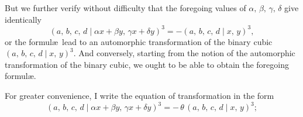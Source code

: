 \documentclass[11pt]{article}
\begin{document}
\medskip
But we further verify without difficulty that the foregoing values of $\alpha,\,\beta,\,\gamma,\,\delta$ give
identically
\[
  (a,\,b,\,c,\,d \mid \alpha x + \beta y,\,\gamma x + \delta y)^{3} = -(a,\,b,\,c,\,d \mid x,\,y)^{3},
\]
or the formul\ae\ lead to an automorphic transformation of the binary cubic
$(a,\,b,\,c,\,d \mid x,\,y)^{3}$.
And conversely, starting from the notion of the automorphic transformation of the binary
cubic, we ought to be able to obtain the foregoing formul\ae.

\medskip
For greater convenience, I write the equation of transformation in the form
\[
  (a,\,b,\,c,\,d \mid \alpha x + \beta y,\,\gamma x + \delta y)^{3} = -\,\theta\,(a,\,b,\,c,\,d \mid x,\,y)^{3};
\]
\end{document}
